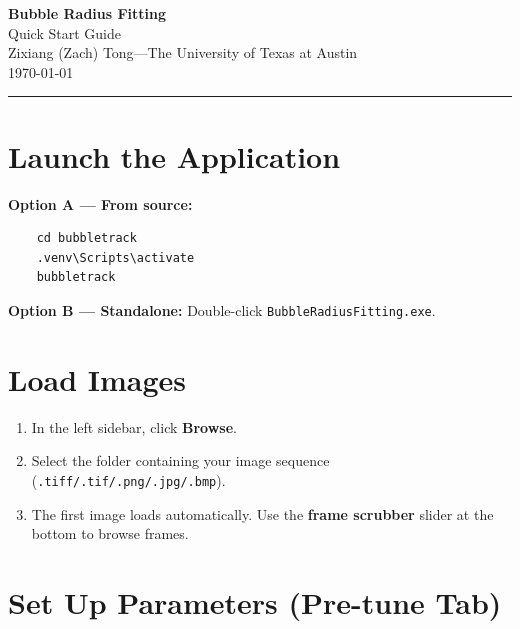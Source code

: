 \documentclass[11pt, letterpaper]{article}
\begin{document}
\begin{center}
    {\Huge\bfseries\color{darknavy} Bubble Radius Fitting}\\[0.4cm]
    {\LARGE\color{primaryblue} Quick Start Guide}\\[0.8cm]
    {\large Zixiang (Zach) Tong\quad---\quad The University of Texas at Austin}\\[0.3cm]
    {\large \today}
\end{center}

\vspace{0.5cm}
\hrule
\vspace{0.8cm}


\section{Launch the Application}

\textbf{Option A --- From source:}
\begin{verbatim}
    cd bubbletrack
    .venv\Scripts\activate
    bubbletrack
\end{verbatim}

\textbf{Option B --- Standalone:} Double-click \texttt{BubbleRadiusFitting.exe}.


\section{Load Images}

\begin{enumerate}
    \item In the left sidebar, click \textbf{Browse}.
    \item Select the folder containing your image sequence
          (\texttt{.tiff/.tif/.png/.jpg/.bmp}).
    \item The first image loads automatically. Use the \textbf{frame scrubber}
          slider at the bottom to browse frames.
\end{enumerate}


\section{Set Up Parameters (Pre-tune Tab)}
\end{document}

